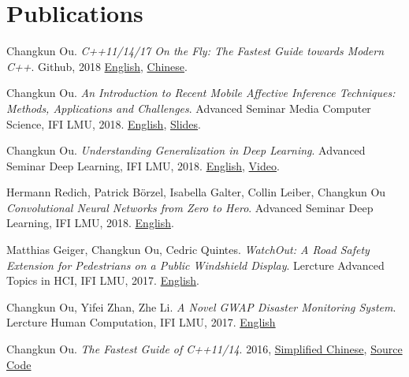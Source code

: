 \section{\textbf{Publications}}
 \resumeSubHeadingListStart
    \item{
      Changkun Ou.
      \emph{C++11/14/17 On the Fly: The Fastest Guide towards Modern C++}.
      Github, 2018 \href{https://github.com/changkun/modern-cpp-tutorial}{English}, \href{https://github.com/changkun/modern-cpp-tutorial}{Chinese}.
    }
    \item{
      Changkun Ou.
      \emph{An Introduction to Recent Mobile Affective Inference Techniques: Methods, Applications and Challenges}.
      Advanced Seminar Media Computer Science, IFI LMU, 2018. \href{https://github.com/changkun/hs-ws17-mobile-emotion-inference/blob/master/src/lmumihs-ou.pdf}{English}, \href{https://github.com/changkun/hs-ws17-mobile-emotion-inference/blob/master/slides/presentation-final.pdf}{Slides}.
    }
    \item{
      Changkun Ou.
      \emph{Understanding Generalization in Deep Learning}.
      Advanced Seminar Deep Learning, IFI LMU, 2018. \href{https://docs.google.com/presentation/d/1eNUYH9_3bbBO7bONPU8BCTr2DOMC69gdOJvBgpLjwNg/edit#slide=id.g2cdf1dbd0b_1_6}{English}, \href{https://www.youtube.com/watch?v=z9je5YlnBgI&t=1585s}{Video}.
    }   
    \item{
      Hermann Redich, Patrick Börzel, Isabella Galter, Collin Leiber, Changkun Ou
      \emph{Convolutional Neural Networks from Zero to Hero}.
      Advanced Seminar Deep Learning, IFI LMU, 2018. \href{https://github.com/changkun/talks/blob/master/201712/cnn.pdf}{English}.
    }
    \item{
        Matthias Geiger, Changkun Ou, Cedric Quintes.
        \emph{WatchOut: A Road Safety Extension for Pedestrians on a Public Windshield Display}.
        Lercture Advanced Topics in HCI, IFI LMU, 2017. \href{https://github.com/changkun/ath-windshild-display/blob/master/paper/ath.pdf}{English}.
    }
    \item{
      Changkun Ou, Yifei Zhan, Zhe Li.
      \emph{A Novel GWAP Disaster Monitoring System}.
      Lercture Human Computation, IFI LMU, 2017.
      \href{https://github.com/changkun/hc-ss17-disaster-monitoring/blob/master/report/hc_final_project_report_team_Hotpot.pdf}{English}
    }
   \item{
       Changkun Ou.
       \emph{The Fastest Guide of C++11/14}. 
       2016, 
       \href{https://www.gitbook.com/book/changkun/cpp1x-tutorial/details}{Simplified Chinese}, 
       \href{https://github.com/changkun/cpp1x-tutorial}{Source Code}
   }
